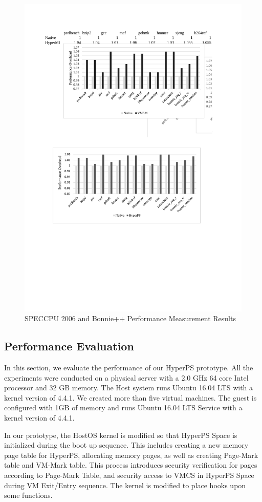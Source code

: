 \begin{figure}[htpb]
    \centering
    \includegraphics[width=0.8\linewidth]{IMG/performance.pdf}
    \caption{SPECCPU 2006 and Bonnie++ Performance Measurement Results}%
    \label{fig5}
\end{figure}

\subsection{Performance Evaluation}
In this section, we evaluate the performance of our HyperPS prototype. All the experiments were conducted on a physical server with a 2.0 GHz 64 core Intel processor and 32 GB memory. The Host system runs Ubuntu 16.04 LTS with a kernel version of 4.4.1. We created more than five virtual machines. The guest is configured with 1GB of memory and runs Ubuntu 16.04 LTS Service with a kernel version of 4.4.1. 


In our prototype, the HostOS kernel is modified so that HyperPS Space is initialized during the boot up sequence. This includes creating a new memory page table for HyperPS, allocating memory pages, as well as creating Page-Mark table and VM-Mark table. This process introduces security verification for pages according to Page-Mark Table, and security access to VMCS in HyperPS Space during VM Exit/Entry sequence.
The kernel is modified to place hooks upon some functions.

